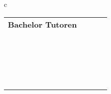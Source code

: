   \begin{tabular}{c}
\begin{tabular}{ccc}
  { \textbf{Bachelor Tutoren}} \ \\ 
{
\npicture[0.3\linewidth]
{bilder/tutoren/dominik_pass}
{Dominik\\%
\randomize{d.schuermann@tu-bs.de}}
}%
& \ 
{\npicture[0.3\linewidth]
{bilder/tutoren/jan_germann.jpg}
{Jan\\%
\randomize{j.germann@tu-braunschweig.de}}
} 
&
{
\npicture[0.3\linewidth]
{bilder/tutoren/hella.jpg}
{Hella\\%
\randomize{h-f.hoffmann@tu-bs.de}}}
 \\ \  \\
{\npicture[0.3\linewidth]
{bilder/tutoren/johannes.jpg}
{Johannes\\%
\randomize{J.Starosta@tu-bs.de}}
}& \ 
 {
 \npicture[0.3\linewidth]
 {bilder/tutoren/sebastian.jpeg}
 {Sebastian\\ %
\randomize{se.busse@tu-bs.de}}} 

\end{tabular}
\end{tabular}
